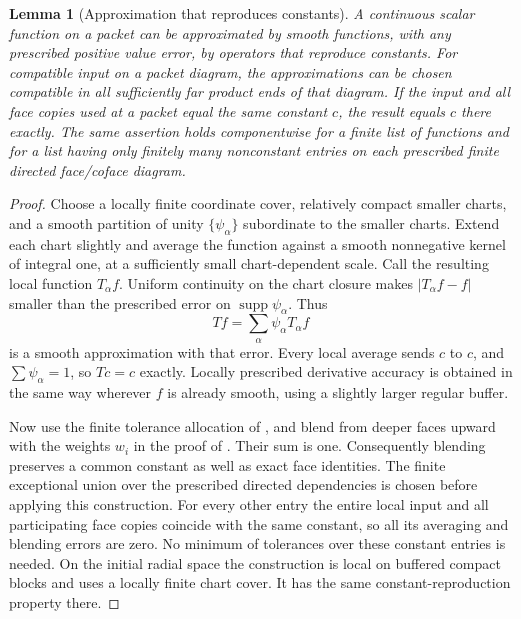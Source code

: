 \documentclass[11pt]{article}
\numberwithin{equation}{section}
\newtheorem{lemma}[theorem]{Lemma}
\theoremstyle{definition}
\theoremstyle{remark}
\begin{document}
\begin{lemma}[Approximation that reproduces constants]\label{regular:constant-preservation}
A continuous scalar function on a packet can be approximated by smooth
functions, with any prescribed positive value error, by operators that
reproduce constants.  For compatible input on a packet diagram, the
approximations can be chosen compatible in all sufficiently far product
ends of that diagram.  If the input and all face copies
used at a packet equal the same constant $c$, the result equals $c$
there exactly.  The same assertion holds componentwise for a finite list
of functions and for a list having only finitely many nonconstant entries
on each prescribed finite directed face/coface diagram.
\end{lemma}

\begin{proof}
Choose a locally finite coordinate cover, relatively compact smaller
charts, and a smooth partition of unity $\{\psi_\alpha\}$ subordinate
to the smaller charts.  Extend each chart slightly and average the
function against a smooth nonnegative kernel of integral one, at a
sufficiently small chart-dependent scale.  Call the resulting local
function $T_\alpha f$.  Uniform continuity on the chart closure makes
$|T_\alpha f-f|$ smaller than the prescribed error on
$\operatorname{supp}\psi_\alpha$.  Thus
\[
                    Tf=\sum_\alpha\psi_\alpha T_\alpha f
\]
is a smooth approximation with that error.  Every local average sends
$c$ to $c$, and $\sum\psi_\alpha=1$, so $Tc=c$ exactly.  Locally
prescribed derivative accuracy is obtained in the same way wherever
$f$ is already smooth, using a slightly larger regular buffer.

Now use the finite tolerance allocation of
, and blend from deeper faces upward with
the weights $w_i$ in the proof of .  Their sum
is one.  Consequently blending preserves a common constant as well as
exact face identities.  The finite exceptional union over the prescribed
directed dependencies is chosen before applying this construction.
For every other entry the entire local input and all participating face
copies coincide with the same constant, so all its averaging and
blending errors are zero.  No minimum of tolerances over these constant
entries is needed.  On the initial radial space the construction is
local on buffered compact blocks and uses a locally finite chart cover.
It has the same constant-reproduction property there.
\end{proof}
\end{document}

